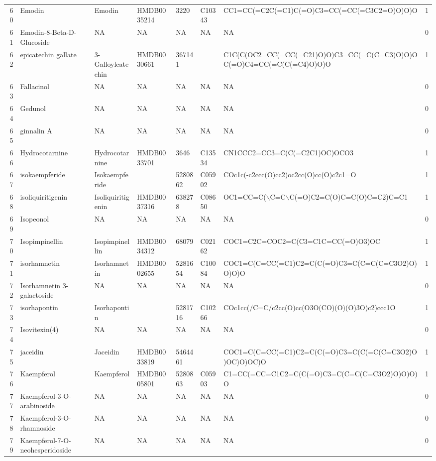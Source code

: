 \documentclass[a4paper]{article}
\begin{document}
\begin{longtable}{rlllllll}
  60 & Emodin & Emodin & HMDB0035214 & 3220 & C10343 & CC1=CC(=C2C(=C1)C(=O)C3=CC(=CC(=C3C2=O)O)O)O & 1 \\ 
  61 & Emodin-8-Beta-D-Glucoside & NA & NA & NA & NA & NA & 0 \\ 
  62 & epicatechin gallate & 3-Galloylcatechin & HMDB0030661 & 367141 &  & C1C(C(OC2=CC(=CC(=C21)O)O)C3=CC(=C(C=C3)O)O)OC(=O)C4=CC(=C(C(=C4)O)O)O & 1 \\ 
  63 & Fallacinol & NA & NA & NA & NA & NA & 0 \\ 
  64 & Gedunol & NA & NA & NA & NA & NA & 0 \\ 
  65 & ginnalin A & NA & NA & NA & NA & NA & 0 \\ 
  66 & Hydrocotarnine & Hydrocotarnine & HMDB0033701 & 3646 & C13534 & CN1CCC2=CC3=C(C(=C2C1)OC)OCO3 & 1 \\ 
  67 & isokaempferide & Isokaempferide &  & 5280862 & C05902 & COc1c(-c2ccc(O)cc2)oc2cc(O)cc(O)c2c1=O & 1 \\ 
  68 & isoliquiritigenin & Isoliquiritigenin & HMDB0037316 & 638278 & C08650 & OC1=CC=C($\backslash$C=C$\backslash$C(=O)C2=C(O)C=C(O)C=C2)C=C1 & 1 \\ 
  69 & Isopeonol & NA & NA & NA & NA & NA & 0 \\ 
  70 & Isopimpinellin & Isopimpinellin & HMDB0034312 & 68079 & C02162 & COC1=C2C=COC2=C(C3=C1C=CC(=O)O3)OC & 1 \\ 
  71 & isorhamnetin & Isorhamnetin & HMDB0002655 & 5281654 & C10084 & COC1=C(C=CC(=C1)C2=C(C(=O)C3=C(C=C(C=C3O2)O)O)O)O & 1 \\ 
  72 & Isorhamnetin 3-galactoside & NA & NA & NA & NA & NA & 0 \\ 
  73 & isorhapontin & Isorhapontin &  & 5281716 & C10266 & COc1cc(/C=C/c2cc(O)cc(O3O(CO)(O)(O)3O)c2)ccc1O & 1 \\ 
  74 & Isovitexin(4) & NA & NA & NA & NA & NA & 0 \\ 
  75 & jaceidin & Jaceidin & HMDB0033819 & 5464461 &  & COC1=C(C=CC(=C1)C2=C(C(=O)C3=C(C(=C(C=C3O2)O)OC)O)OC)O & 1 \\ 
  76 & Kaempferol & Kaempferol & HMDB0005801 & 5280863 & C05903 & C1=CC(=CC=C1C2=C(C(=O)C3=C(C=C(C=C3O2)O)O)O)O & 1 \\ 
  77 & Kaempferol-3-O-arabinoside & NA & NA & NA & NA & NA & 0 \\ 
  78 & Kaempferol-3-O-rhamnoside & NA & NA & NA & NA & NA & 0 \\ 
  79 & Kaempferol-7-O-neohesperidoside & NA & NA & NA & NA & NA & 0 \\ 

\end{longtable}
\end{document}
